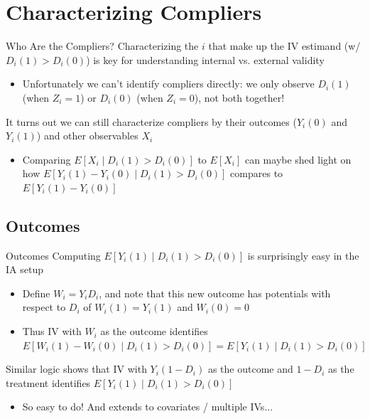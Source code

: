 \documentclass{beamer}
\begin{document}
\section{Characterizing Compliers}

\begin{frame}{Who Are the Compliers?}
Characterizing the $i$ that make up the IV estimand (w/$D_i(1)>D_i(0)$) is key for understanding internal vs. external validity \smallskip
\begin{itemize}
\item Unfortunately we can't identify compliers directly: we only observe $D_i(1)$ (when $Z_i=1$) or $D_i(0)$ (when $Z_i=0$), not both together!
\end{itemize}\bigskip\pause{}
It turns out we can still characterize compliers by their outcomes ($Y_i(0)$ and $Y_i(1)$) and other observables $X_i$\smallskip
\begin{itemize}
\item Comparing $E[X_i\mid D_i(1)>D_i(0)]$ to $E[X_i]$ can maybe shed light on how $E[Y_i(1)-Y_i(0)\mid D_i(1)>D_i(0)]$ compares to $E[Y_i(1)-Y_i(0)]$
\end{itemize}
\end{frame}

\subsection{Outcomes}
\begin{frame}{Outcomes}
Computing $E[Y_i(1)\mid D_i(1)>D_i(0)]$ is surprisingly easy in the IA setup\smallskip
\begin{itemize}
\item Define $W_i=Y_iD_i$, and note that this new outcome has potentials with respect to $D_i$ of $W_i(1)=Y_i(1)$ and $W_i(0)=0$\smallskip\pause{}
\item Thus IV with $W_i$ as the outcome identifies $E[W_i(1)-W_i(0)\mid D_i(1)>D_i(0)]=E[Y_i(1)\mid D_i(1)>D_i(0)]$
\end{itemize}\medskip\pause{}
Similar logic shows that IV with $Y_i(1-D_i)$ as the outcome and $1-D_i$ as the treatment identifies $E[Y_i(1)\mid D_i(1)>D_i(0)]$\smallskip
\begin{itemize}
\item So easy to do! And extends to covariates / multiple IVs...
\end{itemize}
\end{frame}
\end{document}
